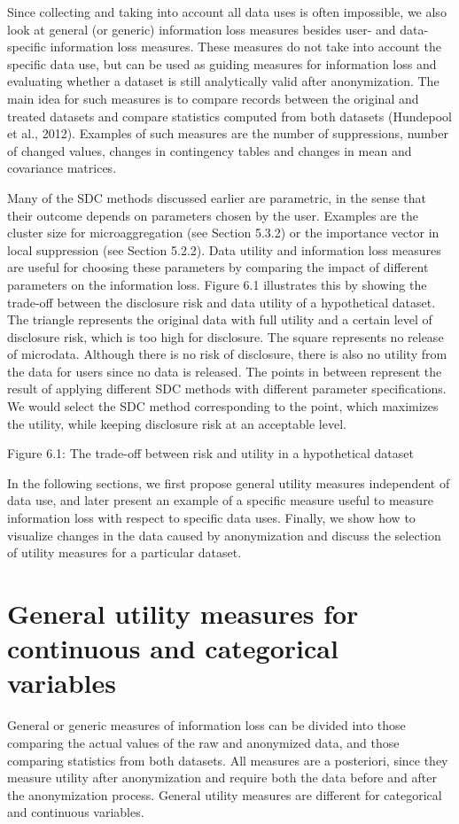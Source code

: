 \documentclass[letterpaper,10pt,english]{sphinxmanual}
\begin{document}
Since collecting and taking into account all data uses is often
impossible, we also look at general (or generic) information loss
measures besides user- and data-specific information loss measures.
These measures do not take into account the specific data use, but can
be used as guiding measures for information loss and evaluating whether
a dataset is still analytically valid after anonymization. The main idea
for such measures is to compare records between the original and treated
datasets and compare statistics computed from both datasets (Hundepool
et al., 2012). Examples of such measures are the number of suppressions,
number of changed values, changes in contingency tables and changes in
mean and covariance matrices.

Many of the SDC methods discussed earlier are parametric, in the sense
that their outcome depends on parameters chosen by the user. Examples
are the cluster size for microaggregation (see Section 5.3.2) or the
importance vector in local suppression (see Section 5.2.2). Data utility
and information loss measures are useful for choosing these parameters
by comparing the impact of different parameters on the information loss.
Figure 6.1 illustrates this by showing the trade-off between the
disclosure risk and data utility of a hypothetical dataset. The triangle
represents the original data with full utility and a certain level of
disclosure risk, which is too high for disclosure. The square represents
no release of microdata. Although there is no risk of disclosure, there
is also no utility from the data for users since no data is released.
The points in between represent the result of applying different SDC
methods with different parameter specifications. We would select the SDC
method corresponding to the point, which maximizes the utility, while
keeping disclosure risk at an acceptable level.

\noindent{}

Figure 6.1: The trade-off between risk and utility in a hypothetical
dataset

In the following sections, we first propose general utility measures
independent of data use, and later present an example of a specific
measure useful to measure information loss with respect to specific data
uses. Finally, we show how to visualize changes in the data caused by
anonymization and discuss the selection of utility measures for a
particular dataset.


\section{General utility measures for continuous and categorical variables}
\label{\detokenize{utility:general-utility-measures-for-continuous-and-categorical-variables}}
General or generic measures of information loss can be divided into
those comparing the actual values of the raw and anonymized data, and
those comparing statistics from both datasets. All measures are a
posteriori, since they measure utility after anonymization and require
both the data before and after the anonymization process. General
utility measures are different for categorical and continuous variables.
\end{document}
